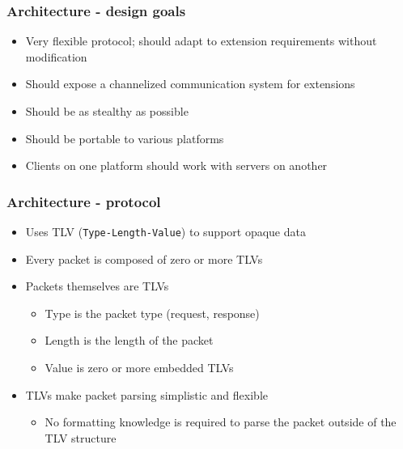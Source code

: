 \documentclass{beamer}
\newenvironment{sitemize}{\vspace{1mm}\begin{itemize}\itemsep 4pt\small}{\end{itemize}}
\begin{document}
\begin{frame}[t]
    \frametitle{Architecture - design goals}

    \begin{sitemize}
        \item Very flexible protocol; should adapt to extension
        requirements without modification

        \pause
        \item Should expose a channelized communication system for
        extensions

        \pause
        \item Should be as stealthy as possible

        \pause
        \item Should be portable to various platforms

        \pause
        \item Clients on one platform should work with servers on
        another
    \end{sitemize}
\end{frame}

\begin{frame}[t]
    \frametitle{Architecture - protocol}

    \begin{sitemize}
        \item Uses TLV (\texttt{Type-Length-Value}) to support
        opaque data

        \pause
        \item Every packet is composed of zero or more TLVs

        \pause
        \item Packets themselves are TLVs
        \begin{sitemize}
            \item Type is the packet type (request, response)
            \item Length is the length of the packet
            \item Value is zero or more embedded TLVs
        \end{sitemize}

        \pause
        \item TLVs make packet parsing simplistic and flexible
        \begin{sitemize}
            \item No formatting knowledge is required to parse the
            packet outside of the TLV structure
        \end{sitemize}
    \end{sitemize}
\end{frame}
\end{document}
